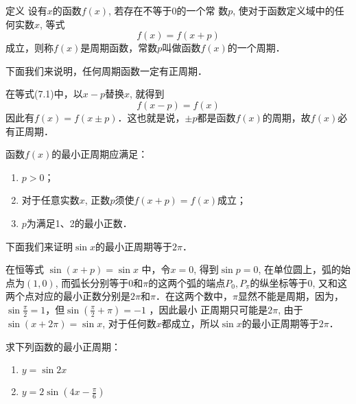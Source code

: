 \begin{blk}{定义}
    设有$x$的函数$f(x)$, 若存在不等于0的一个常
数$p$, 使对于函数定义域中的任何实数$x$, 等式
\begin{equation}
    f (x) =f (x+p) 
\end{equation}
成立，则称$f(x)$是周期函数，常数$p$叫做函数$f(x)$的一个周期．
\end{blk}

下面我们来说明，任何周期函数一定有正周期．

在等式(7.1)中，以$x-p$替换$x$, 就得到
\[f (x-p) =f (x)\]
因此有$f (x) =f (x\pm p)$．这也就是说，$\pm p$都是函数$f(x)$的周期，故$f(x)$必有正周期．

函数$f(x)$的最小正周期应满足：
\begin{enumerate}
    \item $p>0$；
    \item 对于任意实数$x$, 正数$p$须使$f(x+p)=f(x)$成立；
    \item $p$为满足1、2的最小正数．
\end{enumerate}

下面我们来证明$\sin x$的最小正周期等于$2\pi$．

在恒等式 $\sin(x+p)=\sin x$ 中，令$x=0$, 得到$\sin p=0$,
在单位圆上，弧的始点为$(1, 0)$, 而弧长分别等于0和$\pi$的这两个弧的端点$P_0,P_{\pi}$的纵坐标等于0, 又和这两个点对应的最小正数分别是$2\pi$和$\pi$．在这两个数中，$\pi$显然不能是周期，因为，$\sin\frac{\pi}{2}=1$，但$\sin\left(\frac{\pi}{2}+\pi\right)=-1$
，因此最小
正周期只可能是$2\pi$, 由于$\sin(x+2\pi)=\sin x$, 对于任何数$x$都成立，所以$\sin x$的最小正周期等于$2\pi$．

\begin{example}
    求下列函数的最小正周期：
\begin{multicols}{2}
\begin{enumerate}
    \item $y=\sin2x $ 
    \item $y=2\sin\left(4x-\frac{\pi}{6}\right)$
\end{enumerate}
\end{multicols}
\end{example}

